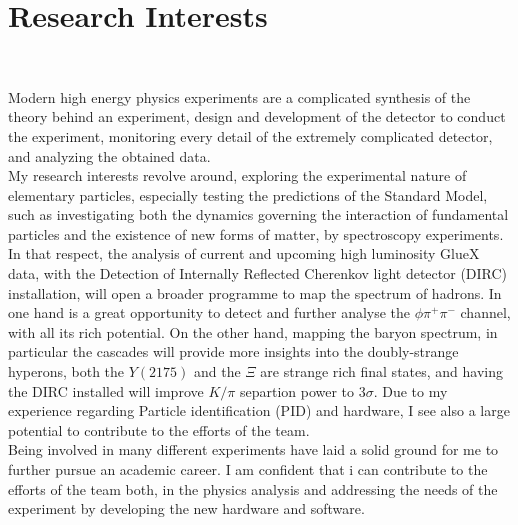 \documentclass[a4paper,roman]{article}
\begin{document}
\section*{Research Interests}
~\par Modern high energy physics experiments are a complicated synthesis of the theory behind an experiment, design and development of the detector to conduct the experiment, monitoring every detail of the extremely complicated detector, and analyzing the obtained data.\\
My research interests revolve around, exploring the experimental nature of elementary particles, especially testing the predictions of the Standard Model, such as investigating both the dynamics governing the interaction of fundamental particles and the existence of new forms of matter, by spectroscopy experiments.\\
In that respect, the analysis of current and upcoming high luminosity GlueX data, with the Detection of Internally Reflected Cherenkov light detector (DIRC) installation, will open a broader programme to map the spectrum of hadrons. In one hand is a great opportunity to detect and further analyse the $\phi\pi^{+}\pi^{-}$ channel, with all its rich potential. On the other hand, mapping the baryon spectrum, in particular the cascades will provide more insights into the doubly-strange hyperons, both the $Y(2175)$ and the $\Xi$ are strange rich final states, and having the DIRC installed will improve $K/\pi$ separtion power to 3$\sigma$. Due to my experience regarding Particle identification (PID) and hardware, I see also a large potential to contribute to the efforts of the team.\\
Being involved in many different experiments have laid a solid ground for me to further pursue an academic career. I am confident that i can contribute to the efforts of the team both, in the physics analysis and addressing the needs of the experiment by developing the new hardware and software.
\end{document}
